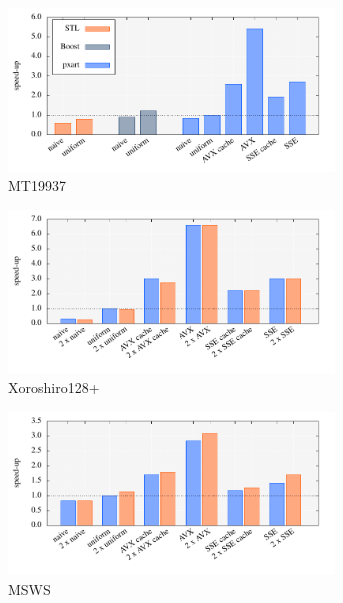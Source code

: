 \documentclass{stdlocal}
\begin{document}
    \begin{figure}
      \center
      \begin{subfigure}[b]{\textwidth}
        \includegraphics[width=0.95\textwidth]{plots/monte_carlo_pi_laptop_mt19937.pdf}
        \caption{MT19937}
      \end{subfigure}

      \begin{subfigure}[b]{\textwidth}
        \includegraphics[width=0.95\textwidth]{plots/monte_carlo_pi_laptop_xrsr128p.pdf}
        \caption{Xoroshiro128+}
      \end{subfigure}

      \begin{subfigure}[b]{\textwidth}
        \includegraphics[width=0.95\textwidth]{plots/monte_carlo_pi_laptop_msws.pdf}
        \caption{MSWS}
      \end{subfigure}
      \caption{}
    \end{figure}
\end{document}
